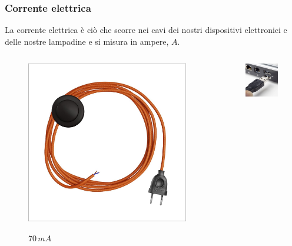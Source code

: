 \documentclass[handout]{beamer}
\theoremstyle{plain}
\begin{document}
\begin{frame}
\frametitle{Corrente elettrica}
La corrente elettrica è ciò che scorre nei cavi dei nostri dispositivi elettronici e delle nostre lampadine e si misura in ampere, $ A $.

\begin{columns}
  \begin{column}{0.3\textwidth}
  \begin{figure}
    \includegraphics[width=\columnwidth]{img/cavo.jpg}

    $ 70 \, mA $
  \end{figure}    
  \end{column}
  \begin{column}{0.3\textwidth}
  \begin{figure}
    \includegraphics[width=\columnwidth]{img/usb.jpg}


\end{figure}
\end{column}
\end{columns}
\end{frame}
\end{document}
